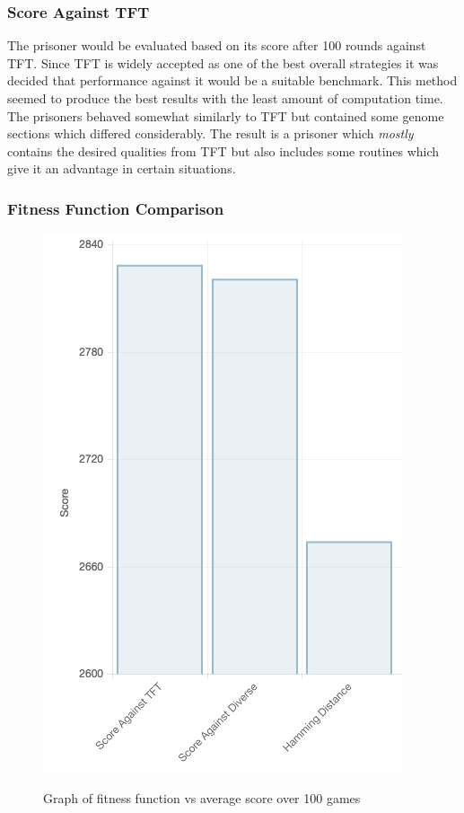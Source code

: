 \documentclass[12pt]{article}
\begin{document}
\subsubsection{Score Against TFT}
\label{tft}

The prisoner would be evaluated based on its score after 100 rounds against
TFT.  Since TFT is widely accepted as one of the best overall strategies it was
decided that performance against it would be a suitable benchmark.
This method seemed to produce the best results with the least
amount of computation time.  The prisoners behaved somewhat similarly
to TFT but contained some genome sections which differed considerably.  The result
is a prisoner which \textit{mostly} contains the desired qualities from TFT
but also includes some routines which give it an advantage in certain situations.


\subsubsection{Fitness Function Comparison}

\begin{figure}[h]
    \label{fig2}
    \centering
    \includegraphics[scale=0.5]{figures/fit_score.png}
    \label{fig1}
    \caption{Graph of fitness function vs average score over 100 games}
\end{figure}
\end{document}
